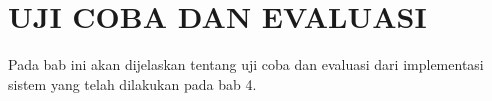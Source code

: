\chapter{UJI COBA DAN EVALUASI}
Pada bab ini akan dijelaskan tentang uji coba dan evaluasi dari implementasi sistem yang telah dilakukan pada bab 4.
